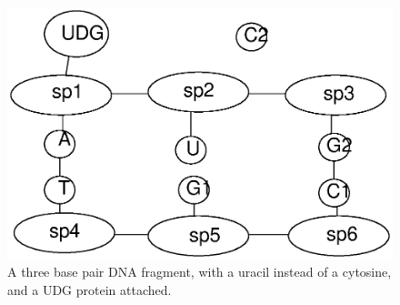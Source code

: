 \documentclass[review]{elsarticle}
\begin{document}
\begin{figure}[h!]
  \centering
    \includegraphics[width=1.0\textwidth]{ber/ber}
  \caption[A three base pair DNA fragment.]{A three base pair DNA fragment, with a uracil instead of a cytosine, and a UDG protein attached.}
  \label{fig:ber}
\end{figure}
\end{document}
